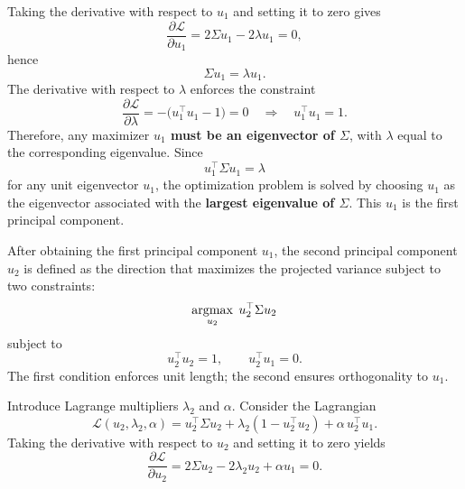 \documentclass[../main]{subfiles}
\begin{document}
    Taking the derivative with respect to $u_1$ and setting it to zero gives
    \begin{equation}
        \frac{\partial \mathcal{L}}{\partial u_1}
        = 2 \Sigma u_1 - 2 \lambda u_1 = 0,
    \end{equation}
    hence
    \begin{equation}
        \Sigma u_1 = \lambda u_1.
    \end{equation}
    The derivative with respect to $\lambda$ enforces the constraint
    \begin{equation}
        \frac{\partial \mathcal{L}}{\partial \lambda}
        = -\bigl(u_1^\top u_1 - 1\bigr) = 0
        \quad\Longrightarrow\quad
        u_1^\top u_1 = 1.
    \end{equation}
    Therefore, any maximizer \textbf{$u_1$ must be an eigenvector of $\Sigma$}, with $\lambda$ equal to the corresponding eigenvalue.
    Since
    \begin{equation}
        u_1^\top \Sigma u_1 = \lambda
    \end{equation}
    for any unit eigenvector $u_1$, the optimization problem is solved by choosing $u_1$ as the eigenvector associated with the \textbf{largest eigenvalue of $\Sigma$}.  
    This $u_1$ is the first principal component.

    After obtaining the first principal component $u_1$, the second principal component $u_2$ is defined as the direction that maximizes the projected variance subject to two constraints:
\begin{equation}
    \mathop{\mathrm{argmax}}_{u_2}\; u_2^\top \Sigma u_2
\end{equation}
subject to
\begin{equation}
    u_2^\top u_2 = 1,
    \qquad
    u_2^\top u_1 = 0.
\end{equation}
The first condition enforces unit length; the second ensures orthogonality to $u_1$.

Introduce Lagrange multipliers $\lambda_2$ and $\alpha$.  
Consider the Lagrangian
\begin{equation}
\mathcal{L}(u_2,\lambda_2,\alpha)
    = u_2^\top \Sigma u_2
      + \lambda_2 (1 - u_2^\top u_2)
      + \alpha\, u_2^\top u_1.
\end{equation}
Taking the derivative with respect to $u_2$ and setting it to zero yields
\begin{equation}
    \frac{\partial \mathcal{L}}{\partial u_2}
    = 2 \Sigma u_2 - 2 \lambda_2 u_2 + \alpha u_1 = 0.
\end{equation}
\end{document}
